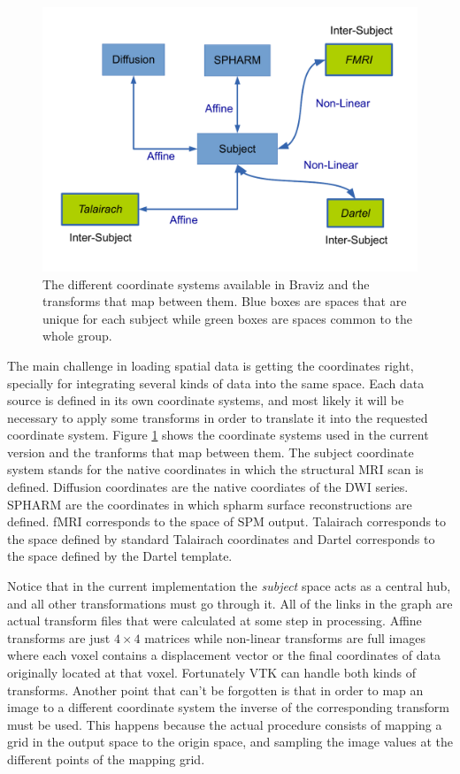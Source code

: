 \begin{figure}
\includegraphics[width=\textwidth]{figures/coordinate_systems}
\caption{\label{fig_coordinates} The different coordinate systems available in Braviz and the transforms that map between them. Blue boxes are spaces that are unique for each subject while green boxes are spaces common to the whole group.  }
\end{figure}

The main challenge in loading spatial data is getting the coordinates right, specially for integrating several kinds of data into the same space. Each data source is defined in its own coordinate systems, and most likely it will be necessary to apply some transforms in order to translate it into the requested coordinate system. Figure \ref{fig_coordinates} shows the coordinate systems used in the current version and the tranforms that map between them. 
The subject coordinate system stands for the native coordinates in which the structural MRI scan is defined. Diffusion coordinates are the native coordiates of the DWI series. SPHARM are the coordinates in which spharm surface reconstructions are defined. fMRI corresponds to the space of SPM output. Talairach corresponds to the space defined by standard Talairach coordinates and Dartel corresponds to the space defined by the Dartel template.

Notice that in the current implementation the \emph{subject} space acts as a central hub, and all other transformations must go through it. All of the links in the graph are actual transform files that were calculated at some step in processing. Affine transforms are just $4\times4$ matrices while non-linear transforms are full images where each voxel contains a displacement vector or the final coordinates of data originally located at that voxel. Fortunately VTK can handle both kinds of transforms. Another point that can't be forgotten is that in order to map an image to a different coordinate system the inverse of the corresponding transform must be used. This happens because the actual procedure consists of mapping a grid in the output space to the origin space, and sampling the image values at the different points of the mapping grid.


